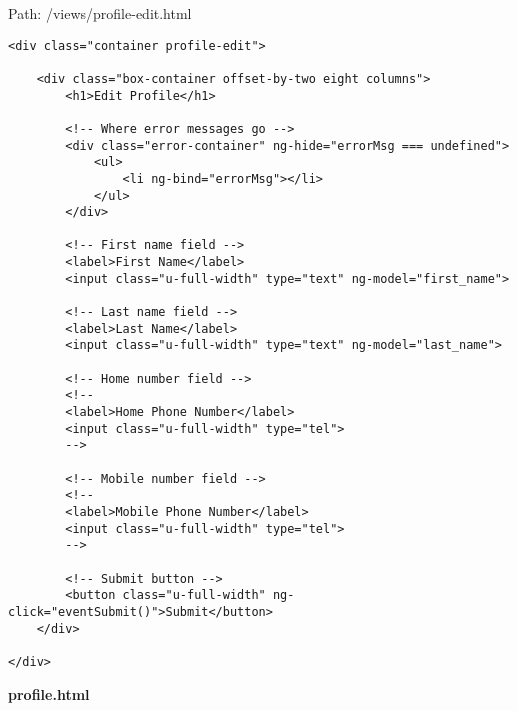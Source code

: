 Path: /views/profile-edit.html
{\scriptsize
\begin{lstlisting}
<div class="container profile-edit">

	<div class="box-container offset-by-two eight columns">
		<h1>Edit Profile</h1>

		<!-- Where error messages go -->
		<div class="error-container" ng-hide="errorMsg === undefined">
			<ul>
				<li ng-bind="errorMsg"></li>
			</ul>
		</div>

		<!-- First name field -->
		<label>First Name</label>
		<input class="u-full-width" type="text" ng-model="first_name">

		<!-- Last name field -->
		<label>Last Name</label>
		<input class="u-full-width" type="text" ng-model="last_name">

		<!-- Home number field -->
		<!--
		<label>Home Phone Number</label>
		<input class="u-full-width" type="tel">
		-->

		<!-- Mobile number field -->
		<!--
		<label>Mobile Phone Number</label>
		<input class="u-full-width" type="tel">
		-->

		<!-- Submit button -->
		<button class="u-full-width" ng-click="eventSubmit()">Submit</button>
	</div>

</div>\end{lstlisting}
}
\textbf{profile.html}\label{profile.html}

